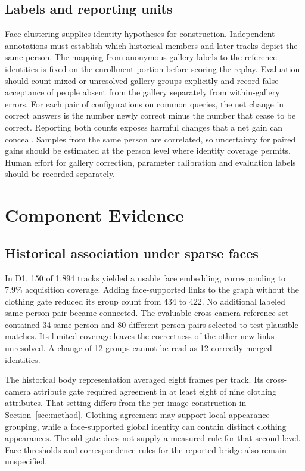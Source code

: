 \documentclass[journal,letterpaper]{IEEEtran}
\newcommand{\draftnote}[3]{\par\smallskip\noindent{\footnotesize
  \textcolor{editink}{\sffamily\bfseries [#2 #1]}\enspace
  \textcolor{editink}{#3}\par}\smallskip}
\newcommand{\expgap}[2]{\draftnote{EXPERIMENT}{#1}{#2}}
\begin{document}
\subsection{Labels and reporting units}
Face clustering supplies identity hypotheses for construction. Independent annotations must establish which historical members and later tracks depict the same person. The mapping from anonymous gallery labels to the reference identities is fixed on the enrollment portion before scoring the replay. Evaluation should count mixed or unresolved gallery groups explicitly and record false acceptance of people absent from the gallery separately from within-gallery errors. For each pair of configurations on common queries, the net change in correct answers is the number newly correct minus the number that cease to be correct. Reporting both counts exposes harmful changes that a net gain can conceal. Samples from the same person are correlated, so uncertainty for paired gains should be estimated at the person level where identity coverage permits. Human effort for gallery correction, parameter calibration and evaluation labels should be recorded separately.
\expgap{E3}{Independently label camera transitions, standing and sitting, clothing changes, face availability, and face errors, then report query counts and paired outcomes within each stratum.}

\section{Component Evidence}\label{sec:results}
\subsection{Historical association under sparse faces}
In D1, 150 of 1,894 tracks yielded a usable face embedding, corresponding to 7.9\% acquisition coverage. Adding face-supported links to the graph without the clothing gate reduced its group count from 434 to 422. No additional labeled same-person pair became connected. The evaluable cross-camera reference set contained 34 same-person and 80 different-person pairs selected to test plausible matches. Its limited coverage leaves the correctness of the other new links unresolved. A change of 12 groups cannot be read as 12 correctly merged identities.

The historical body representation averaged eight frames per track. Its cross-camera attribute gate required agreement in at least eight of nine clothing attributes. That setting differs from the per-image construction in Section~\ref{sec:method}. Clothing agreement may support local appearance grouping, while a face-supported global identity can contain distinct clothing appearances. The old gate does not supply a measured rule for that second level. Face thresholds and correspondence rules for the reported bridge also remain unspecified.
\end{document}
